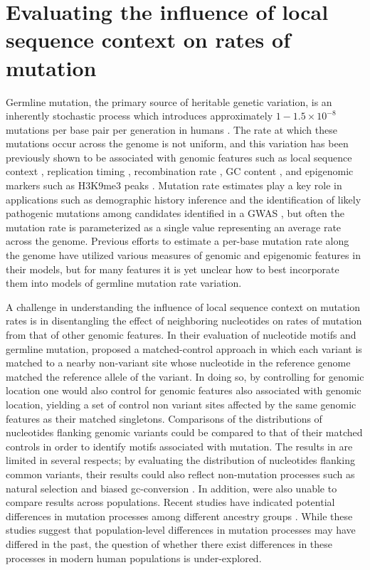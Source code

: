 \chapter{Evaluating the influence of local sequence context on rates of mutation}
\label{chpt:lsci}

Germline mutation, the primary source of heritable genetic 
variation, is an inherently stochastic process which introduces 
approximately $1-1.5 \times 10^{-8}$ 
mutations per base pair per generation in humans \citep{rahbari2015}. 
The rate at which these mutations occur across the genome is not uniform, and this variation has been previously shown to be associated with genomic features such as  local sequence context \citep{Aggarwala2016, Zhu2017, Carlson2018, Seplyarskiy2023}, replication timing \citep{Francioli2015}, recombination rate \citep{Lercher2002}, GC content \citep{Fryxell2004}, and epigenomic markers such as H3K9me3 peaks \citep{Schuster2012, Supek2015}. 
Mutation rate estimates play a key role in applications such as demographic history inference \citep{Li2011} and the identification of likely pathogenic mutations among candidates identified in a GWAS \citep{MacArthur2014}, but often the mutation rate is parameterized as a single value representing an average rate across the genome. 
Previous efforts to estimate a per-base mutation rate along the genome have utilized various measures of genomic and epigenomic features in their models, but for many features it is yet unclear how to best incorporate them into models of germline mutation rate variation.

A challenge in understanding the influence of local sequence context on mutation rates is in disentangling the effect of neighboring nucleotides on rates of mutation from that of other genomic features. In their evaluation of nucleotide motifs and germline mutation, \citep{Zhu2017} proposed a matched-control approach in which each variant is matched to a nearby non-variant site whose nucleotide in the reference genome matched the reference allele of the variant. In doing so, by controlling for genomic location one would also control for genomic features also associated with genomic location, yielding a set of control non variant sites affected by the same genomic features as their matched singletons. Comparisons of the distributions of nucleotides flanking genomic variants could be compared to that of their matched controls in order to identify motifs associated with mutation. The results in \citep{Zhu2017} are limited in several respects; by evaluating the distribution of nucleotides flanking common variants, their results could also reflect non-mutation processes such as natural selection and biased gc-conversion \citep{Carlson2018}. In addition, \citep{Zhu2017} were also unable to compare results across populations. Recent studies have indicated potential differences in mutation processes among different ancestry groups \citep{Harris2017, Mathieson2017}. While these studies suggest that population-level differences in mutation processes may have differed in the past, the question of whether there exist differences in these processes in modern human populations is under-explored.

